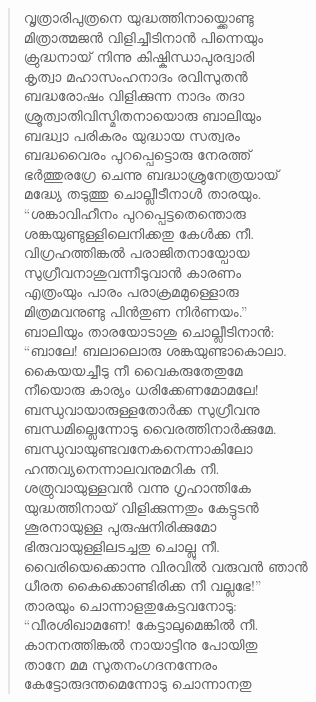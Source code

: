 \begin{verse}
വൃത്രാരിപുത്രനെ യുദ്ധത്തിനായ്ക്കൊണ്ടു\\
മിത്രാത്മജന്‍ വിളിച്ചീടിനാന്‍ പിന്നെയും\\
ക്രുദ്ധനായ് നിന്നു കിഷ്കിന്ധാപുരദ്വാരി\\
കൃത്വാ മഹാസംഹനാദം രവിസുതന്‍\\
ബദ്ധരോഷം വിളിക്കുന്ന നാദം തദാ\\
ശ്രൂത്വാതിവിസ്മിതനായൊരു ബാലിയും\\
ബദ്ധ്വാ പരികരം യുദ്ധായ സത്വരം\\
ബദ്ധവൈരം പുറപ്പെട്ടൊരു നേരത്ത്\\
ഭര്‍ത്തുരഗ്രേ ചെന്നു ബദ്ധാശ്രുനേത്രയായ്\\
മദ്ധ്യേ തടുത്തു ചൊല്ലീടീനാള്‍ താരയും.\\
“ശങ്കാവിഹീനം പുറപ്പെട്ടതെന്തൊരു\\
ശങ്കയുണ്ടുള്ളിലെനിക്കതു കേള്‍ക്ക നീ.\\
വിഗ്രഹത്തിങ്കല്‍ പരാജിതനായ്പോയ\\
സുഗ്രീവനാശുവന്നീടുവാന്‍ കാരണം\\
എത്രംയും പാരം പരാക്രമമുള്ളൊരു\\
മിത്രമവനുണ്ടു പിന്‍തുണ നിര്‍ണയം.”\\
ബാലിയും താരയോടാശു ചൊല്ലീടിനാന്‍:\\
“ബാലേ! ബലാലൊരു ശങ്കയുണ്ടാകൊലാ.\\
കൈയയച്ചീടു നീ വൈകരുതേതുമേ\\
നീയൊരു കാര്യം ധരിക്കേണമോമലേ!\\
ബന്ധുവായാരുള്ളതോര്‍ക്ക സുഗ്രീവനു\\
ബന്ധമില്ലെന്നോടു വൈരത്തിനാര്‍ക്കുമേ.\\
ബന്ധുവായുണ്ടവനേകനെന്നാകിലോ\\
ഹന്തവ്യനെന്നാലവനുമറിക നീ.\\
ശത്രുവായുള്ളവന്‍ വന്നു ഗൃഹാന്തികേ\\
യുദ്ധത്തിനായ് വിളിക്കുന്നതും കേട്ടുടന്‍\\
ശൂരനായുള്ള പുരുഷനിരിക്കുമോ\\
ഭിരുവായുള്ളിലടച്ചതു ചൊല്ലു നീ.\\
വൈരിയെക്കൊന്നു വിരവില്‍ വരുവന്‍ ഞാന്‍\\
ധീരത കൈക്കൊണ്ടിരിക്ക നീ വല്ലഭേ!”\\
താരയും ചൊന്നാളതുകേട്ടവനോടു:\\
“വീരശിഖാമണേ! കേട്ടാലുമെങ്കില്‍ നീ.\\
കാനനത്തിങ്കല്‍ നായാട്ടിനു പോയിതു\\
താനേ മമ സുതനംഗദനന്നേരം\\
കേട്ടോരുദന്തമെന്നോടു ചൊന്നാനതു\\

\end{verse}

